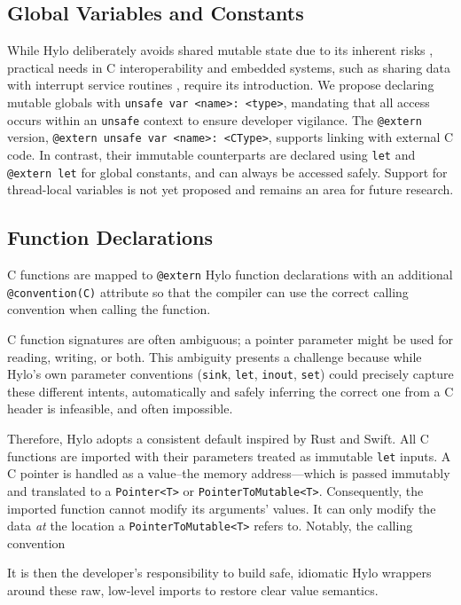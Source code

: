 \subsection{Global Variables and Constants}
While Hylo deliberately avoids shared mutable state due to its inherent risks \cite{sharedmut}\cite{shared-mutable-state}, practical needs in C interoperability and embedded systems, such as sharing data with interrupt service routines \cite{rust-embedded-pain}, require its introduction. We propose declaring mutable globals with \texttt{unsafe var <name>: <type>}, mandating that all access occurs within an \texttt{unsafe} context to ensure developer vigilance. The \texttt{@extern} version, \texttt{@extern unsafe var <name>: <CType>}, supports linking with external C code. In contrast, their immutable counterparts are declared using \texttt{let} and \texttt{@extern let} for global constants, and can always be accessed safely. Support for thread-local variables is not yet proposed and remains an area for future research.

\subsection{Function Declarations}
C functions are mapped to \texttt{@extern} Hylo function declarations with an additional \texttt{@convention(C)} attribute so that the compiler can use the correct calling convention when calling the function.

C function signatures are often ambiguous; a pointer parameter might be used for reading, writing, or both. This ambiguity presents a challenge because while Hylo's own parameter conventions (\texttt{sink}, \texttt{let}, \texttt{inout}, \texttt{set}) could precisely capture these different intents, automatically and safely inferring the correct one from a C header is infeasible, and often impossible.

Therefore, Hylo adopts a consistent default inspired by Rust and Swift. All C functions are imported with their parameters treated as immutable \texttt{let} inputs. A C pointer is handled as a value--the memory address—which is passed immutably and translated to a \texttt{Pointer<T>} or \texttt{PointerToMutable<T>}. Consequently, the imported function cannot modify its arguments' values. It can only modify the data \textit{at} the location a \texttt{PointerToMutable<T>} refers to. Notably, the calling convention 

It is then the developer's responsibility to build safe, idiomatic Hylo wrappers around these raw, low-level imports to restore clear value semantics.

